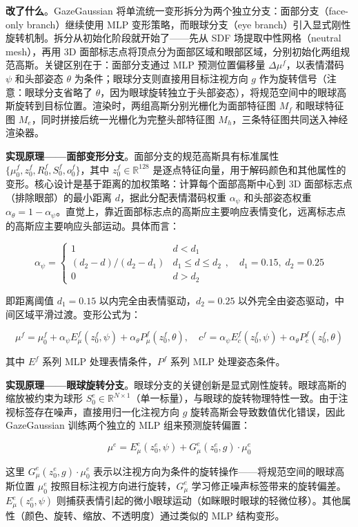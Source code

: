 \textbf{改了什么}。GazeGaussian 将单流统一变形拆分为两个独立分支：面部分支（face-only branch）继续使用 MLP 变形策略，而眼球分支（eye branch）引入显式刚性旋转机制。拆分从初始化阶段就开始了——先从 SDF 场提取中性网格（neutral mesh），再用 3D 面部标志点将顶点分为面部区域和眼部区域，分别初始化两组规范高斯。关键区别在于：面部分支通过 MLP 预测位置偏移量 $\Delta\mu^f$，以表情潜码 $\psi$ 和头部姿态 $\theta$ 为条件；眼球分支则直接用目标注视方向 $g$ 作为旋转信号（注意：眼球分支省略了 $\theta$，因为眼球旋转独立于头部姿态），将规范空间中的眼球高斯旋转到目标位置。渲染时，两组高斯分别光栅化为面部特征图 $M_f$ 和眼球特征图 $M_e$，同时拼接后统一光栅化为完整头部特征图 $M_h$，三条特征图共同送入神经渲染器。

\textbf{实现原理——面部变形分支}。面部分支的规范高斯具有标准属性 $\{\mu_0^f, z_0^f, R_0^f, S_0^f, o_0^f\}$，其中 $z_0^f \in \mathbb{R}^{128}$ 是逐点特征向量，用于解码颜色和其他属性的变形。核心设计是基于距离的加权策略：计算每个面部高斯中心到 3D 面部标志点（排除眼部）的最小距离 $d$，据此分配表情潜码权重 $\alpha_\psi$ 和头部姿态权重 $\alpha_\theta = 1 - \alpha_\psi$。直觉上，靠近面部标志点的高斯应主要响应表情变化，远离标志点的高斯应主要响应头部运动。具体而言：

\[
\alpha_\psi = \begin{cases} 1 & d < d_1 \\ (d_2 - d)/(d_2 - d_1) & d_1 \leq d \leq d_2 \\ 0 & d > d_2 \end{cases}, \quad d_1 = 0.15,\; d_2 = 0.25
\]

即距离阈值 $d_1 = 0.15$ 以内完全由表情驱动，$d_2 = 0.25$ 以外完全由姿态驱动，中间区域平滑过渡。变形公式为：

\[
\mu^f = \mu_0^f + \alpha_\psi E_\mu^f(z_0^f, \psi) + \alpha_\theta P_\mu^f(z_0^f, \theta), \quad c^f = \alpha_\psi E_c^f(z_0^f, \psi) + \alpha_\theta P_c^f(z_0^f, \theta)
\]

其中 $E^f$ 系列 MLP 处理表情条件，$P^f$ 系列 MLP 处理姿态条件。

\textbf{实现原理——眼球旋转分支}。眼球分支的关键创新是显式刚性旋转。眼球高斯的缩放被约束为球形 $S_0^e \in \mathbb{R}^{N \times 1}$（单一标量），与眼球的旋转物理特性一致。由于注视标签存在噪声，直接用归一化注视方向 $g$ 旋转高斯会导致数值优化错误，因此 GazeGaussian 训练两个独立的 MLP 组来预测旋转偏置：

\[
\mu^e = E_\mu^e(z_0^e, \psi) + G_\mu^e(z_0^e, g) \cdot \mu_0^e
\]

这里 $G_\mu^e(z_0^e, g) \cdot \mu_0^e$ 表示以注视方向为条件的旋转操作——将规范空间的眼球高斯位置 $\mu_0^e$ 按照目标注视方向进行旋转，$G_\mu^e$ 学习修正噪声标签带来的旋转偏差。$E_\mu^e(z_0^e, \psi)$ 则捕获表情引起的微小眼球运动（如眯眼时眼球的轻微位移）。其他属性（颜色、旋转、缩放、不透明度）通过类似的 MLP 结构变形。

